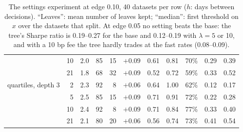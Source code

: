 \documentclass[11pt,a4paper]{article}
\newcommand{\1}{\mathbf{1}}
\begin{document}
\begin{table}[H]
\begin{tabular}{@{}l r r rr r rr r rr@{}}
 & 10 & 2.0 & 85 & 15 & $+0.09$ & 0.61 & 0.81 & 70\% & 0.29 & 0.39\\
 & 21 & 1.8 & 68 & 32 & $+0.09$ & 0.52 & 0.72 & 59\% & 0.33 & 0.52\\
\midrule
quartiles, depth 3 & 2 & 2.3 & 92 & 8 & $+0.06$ & 0.64 & 1.00 & 62\% & 0.12 & 0.17\\
 & 5 & 2.5 & 85 & 15 & $+0.09$ & 0.71 & 0.91 & 72\% & 0.22 & 0.28\\
 & 10 & 2.4 & 92 & 8 & $+0.09$ & 0.71 & 0.84 & 77\% & 0.33 & 0.40\\
 & 21 & 2.1 & 80 & 20 & $+0.06$ & 0.56 & 0.74 & 73\% & 0.41 & 0.54\\
\bottomrule
\end{tabular}
\caption{The settings experiment at edge 0.10, 40 datasets per row ($h$: days between decisions). ``Leaves'': mean number of leaves kept; ``median'': first threshold on $x$ over the datasets that split. At edge 0.05 no setting beats the base: the tree's Sharpe ratio is 0.19--0.27 for the base and 0.12--0.19 with $\lambda=5$ or 10, and with a 10 bp fee the tree hardly trades at the fast rates (0.08--0.09).}
\label{tab:settings}
\end{table}
\end{document}

